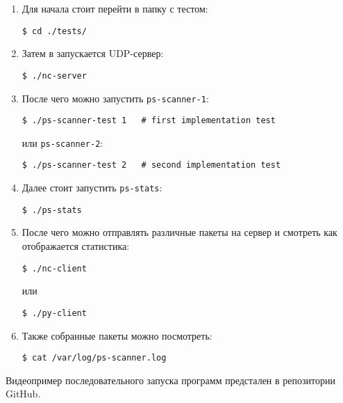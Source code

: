 \begin{enumerate}
\item Для начала стоит перейти в папку с тестом:
\begin{lstlisting}
$ cd ./tests/
\end{lstlisting}

\item Затем в запускается UDP-сервер:
\begin{lstlisting}
$ ./nc-server
\end{lstlisting}

\item После чего можно запустить \verb|ps-scanner-1|:
\begin{lstlisting}
$ ./ps-scanner-test 1   # first implementation test
\end{lstlisting}
или \verb|ps-scanner-2|:
\begin{lstlisting}
$ ./ps-scanner-test 2   # second implementation test
\end{lstlisting}

\item Далее стоит запустить \verb|ps-stats|:
\begin{lstlisting}
$ ./ps-stats
\end{lstlisting}

\newpage

\item После чего можно отправлять различные пакеты на сервер и смотреть как отображается статистика:
\begin{lstlisting}
$ ./nc-client
\end{lstlisting}
или
\begin{lstlisting}
$ ./py-client
\end{lstlisting}

\item Также собранные пакеты можно посмотреть:
\begin{lstlisting}
$ cat /var/log/ps-scanner.log
\end{lstlisting}

\end{enumerate}

\linespace

Видеопример последовательного запуска программ предстален в репозитории GitHub.
